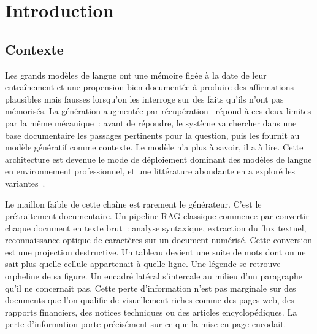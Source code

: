 \chapter*{Introduction}
\label{chap-introduction}

\section*{Contexte}

Les grands modèles de langue ont une mémoire figée à la date de leur
entraînement et une propension bien documentée à produire des affirmations
plausibles mais fausses lorsqu'on les interroge sur des faits qu'ils n'ont pas
mémorisés. La génération augmentée par récupération~\citep{rag2020} répond à ces
deux limites par la même mécanique~: avant de répondre, le système va chercher
dans une base documentaire les passages pertinents pour la question, puis les
fournit au modèle génératif comme contexte. Le modèle n'a plus à savoir,
il a à lire. Cette architecture est devenue le mode de déploiement
dominant des modèles de langue en environnement professionnel, et une
littérature abondante en a exploré les variantes~\citep{ragsurvey2023}.

Le maillon faible de cette chaîne est rarement le générateur. C'est le
prétraitement documentaire. Un pipeline RAG classique commence par convertir
chaque document en texte brut~: analyse syntaxique, extraction du flux
textuel, reconnaissance optique de caractères sur un document
numérisé. Cette conversion est une projection destructive. Un tableau devient
une suite de mots dont on ne sait plus quelle cellule appartenait à quelle
ligne. Une légende se retrouve orpheline de sa figure. Un encadré latéral
s'intercale au milieu d'un paragraphe qu'il ne concernait pas. Cette perte d'information n'est pas marginale sur des
documents que l'on qualifie de visuellement riches comme des pages web,
des rapports financiers, des notices techniques ou des articles encyclopédiques. La perte d'information porte précisément sur ce que la mise en page encodait.

